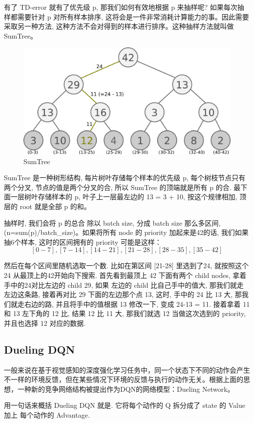 有了 TD-error 就有了优先级 p, 那我们如何有效地根据 p 来抽样呢? 如果每次抽样都需要针对 p 对所有样本排序, 这将会是一件非常消耗计算能力的事。因此需要采取另一种方法, 这种方法不会对得到的样本进行排序。这种抽样方法就叫做SumTree。
\begin{figure}[h]
  \centering
  \includegraphics[scale=0.5]{static/sum_tree.png}
  \caption{SumTree}
\end{figure}
SumTree 是一种树形结构, 每片树叶存储每个样本的优先级 p, 每个树枝节点只有两个分叉, 节点的值是两个分叉的合, 所以 SumTree 的顶端就是所有 p 的合. 最下面一层树叶存储样本的 p, 叶子上一层最左边的 13 = 3 + 10, 按这个规律相加, 顶层的 root 就是全部 p 的和。

抽样时, 我们会将 p 的总合 除以 batch size, 分成 batch size 那么多区间, (n=sum(p)/batch\_size)。如果将所有 node 的 priority 加起来是42的话, 我们如果抽6个样本, 这时的区间拥有的 priority 可能是这样：
$$[0-7], [7-14], [14-21], [21-28], [28-35], [35-42]$$

然后在每个区间里随机选取一个数. 比如在第区间 [21-28] 里选到了24, 就按照这个 24 从最顶上的42开始向下搜索. 首先看到最顶上 42 下面有两个 child nodes, 拿着手中的24对比左边的 child 29, 如果 左边的 child 比自己手中的值大, 那我们就走左边这条路, 接着再对比 29 下面的左边那个点 13, 这时, 手中的 24 比 13 大, 那我们就走右边的路, 并且将手中的值根据 13 修改一下, 变成 24-13 = 11. 接着拿着 11 和 13 左下角的 12 比, 结果 12 比 11 大, 那我们就选 12 当做这次选到的 priority, 并且也选择 12 对应的数据.
\subsection{Dueling DQN}
一般来说在基于视觉感知的深度强化学习任务中，同一个状态下不同的动作会产生不一样的环境反馈，但在某些情况下环境的反馈与执行的动作无关。根据上面的思想，一种新的竞争网络结构被提出作为DQN的网络模型：Dueling Network。

用一句话来概括 Dueling DQN\cite{wang2015dueling} 就是. 它将每个动作的 Q 拆分成了 state 的 Value 加上 每个动作的 Advantage.

